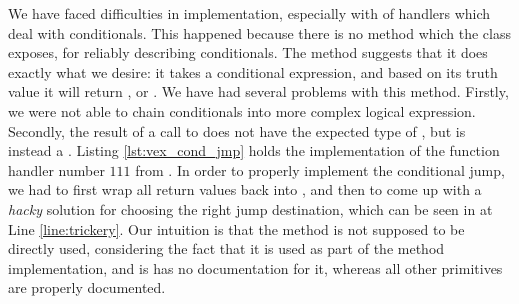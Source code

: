 We have faced difficulties in implementation, especially with of handlers which deal with conditionals. This happened because there is no method which the  class exposes, for reliably describing conditionals. The  method suggests that it does exactly what we desire: it takes a conditional expression, and based on its truth value it will return , or . We have had several problems with this method. Firstly, we were not able to chain conditionals into more complex logical expression. Secondly, the result of a call to  does not have the expected type of , but is instead a . Listing \ref{lst:vex_cond_jmp} holds the implementation of the function handler number $111$ from . In order to properly implement the conditional jump, we had to first wrap all  return values back into , and then to come up with a \emph{hacky} solution for choosing the right jump destination, which can be seen in at Line \ref{line:trickery}. Our intuition is that the  method is not supposed to be directly used, considering the fact that it is used as part of the  method implementation, and is has no documentation for it, whereas all other primitives are properly documented.

